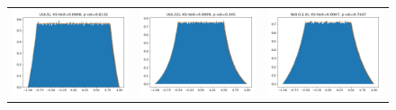 \begin{figure}[tb]
\begin{tabular}{l l l}
\\
\includegraphics[scale=0.25]{pics/Error_U_4_5.png}
&
\includegraphics[scale=0.25]{pics/Error_U_4_32.png}
&
\includegraphics[scale=0.25]{pics/Error_N_0_1.png}

\end{tabular}
\end{figure}
